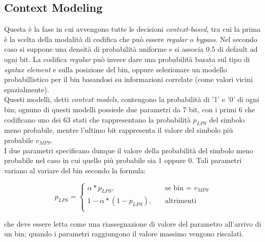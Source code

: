 \subsection{Context Modeling}
Questa è la fase in cui avvengono tutte le decisioni \emph{context-based}, tra
cui la prima è la scelta della modalità di codifica che può essere \emph{
regular} o \emph{bypass}. Nel secondo caso si suppone una densità di probabilità
uniforme e si associa $0.5$ di default ad ogni bit. La codifica \emph{regular}
può invece dare una probabilità basata sul tipo di \emph{syntax element} e sulla
posizione del bin, oppure selezionare un modello probabillistico per il bin 
basandosi su informazioni correlate (come valori vicini spazialmente). \\
Questi modelli, detti \emph{context models}, contengono la probabilità di '1' e
'0' di ogni bin; ognuno di questi modelli possiede due parametri  da 7 bit, con
i primi 6 che codificano uno dei 63 stati che rappresentano la probabilità 
$p_{LPS}$ del simbolo meno probabile, mentre l'ultimo bit rappresenta il valore 
del simbolo più probabile $v_{MPS}$. \\
I due parametri specificano dunque il valore della probabilità del simbolo meno
probabile nel caso in cui quello più probabile sia 1 oppure 0. Tali parametri 
variano al variare del bin secondo la formula:

\[ p_{LPS} = 
\begin{cases}
  \alpha * p_{LPS},         & \quad \text{se bin = } v_{MPS} \\
  1- \alpha *(1-p_{LPS}),   & \quad \text{altrimenti} \\
\end{cases}
\]

che deve essere letta come una riassegnazione di valore del parametro all'arrivo
di un bin; quando i parametri raggiungono il valore massimo vengono riscalati.

